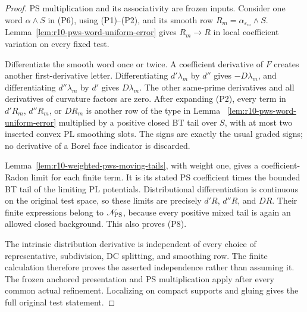 \begin{proof}
PS multiplication and its associativity are frozen inputs.
Consider one word $\alpha\wedge S$ in (P6), using (P1)--(P2),
and its smooth row $R_m=\alpha_{\varepsilon_m}\wedge S$.
Lemma~\ref{lem:r10-pws-word-uniform-error} gives
$R_m\to R$ in local coefficient variation on every fixed test.

Differentiate the smooth word once or twice.  A coefficient
derivative of $F$ creates another first-derivative letter.
Differentiating $d'\lambda_m$ by $d''$ gives
$-D\lambda_m$, and differentiating $d''\lambda_m$ by $d'$
gives $D\lambda_m$.  The other same-prime derivatives and
all derivatives of curvature factors are zero.  After
expanding (P2), every term in $d'R_m$, $d''R_m$, or $DR_m$
is another row of the type in Lemma
~\ref{lem:r10-pws-word-uniform-error} multiplied by a positive
closed BT tail over $S$, with at most two inserted convex
PL smoothing slots.  The signs are exactly the usual graded
signs; no derivative of a Borel face indicator is discarded.

Lemma~\ref{lem:r10-weighted-pws-moving-tails}, with weight
one, gives a coefficient-Radon limit for each finite term.
It is its stated PS coefficient times the bounded BT tail
of the limiting PL potentials.  Distributional differentiation
is continuous on the original test space, so these limits are
precisely $d'R$, $d''R$, and $DR$.  Their finite expressions
belong to $\mathscr N_{\rm PS}$, because every positive
mixed tail is again an allowed closed background.  This also
proves (P8).

The intrinsic distribution derivative is independent of every
choice of representative, subdivision, DC splitting, and
smoothing row.  The finite calculation therefore proves
the asserted independence rather than assuming it.
The frozen anchored presentation and PS multiplication apply
after every common actual refinement.  Localizing on compact
supports and gluing gives the full original test statement.
\end{proof}

